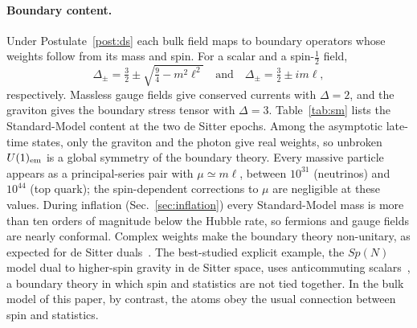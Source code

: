 \documentclass[reprint,aps,prd,amsmath,amssymb,superscriptaddress,nofootinbib,floatfix]{revtex4-2}
\theoremstyle{plain}
\theoremstyle{definition}
\theoremstyle{remark}
\begin{document}
\paragraph*{Boundary content.} Under Postulate~\ref{post:ds} each bulk field maps to boundary operators whose weights
follow from its mass and spin. For a scalar and a spin-$\tfrac12$ field,
\begin{equation}
\Delta_\pm=\tfrac32\pm\sqrt{\tfrac94-m^2\ell^2}\quad\text{and}\quad\Delta_\pm=\tfrac32\pm im\ell ,
\label{eq:weights}
\end{equation}
respectively. Massless gauge fields give conserved currents with $\Delta=2$, and the graviton gives the boundary stress
tensor with $\Delta=3$. Table~\ref{tab:sm} lists the Standard-Model content at the two de Sitter epochs. Among the asymptotic
late-time states, only the graviton and the photon give real weights, so unbroken $U(1)_{\rm em}$ is a global symmetry
of the boundary theory. Every massive particle appears as a principal-series pair with
$\mu\simeq m\ell$, between $10^{31}$ (neutrinos) and $10^{44}$ (top quark); the spin-dependent corrections to $\mu$ are
negligible at these values. During inflation (Sec.~\ref{sec:inflation}) every Standard-Model mass is more than ten orders of
magnitude below the Hubble rate, so fermions and gauge fields are nearly conformal. Complex weights make the
boundary theory non-unitary, as expected for de Sitter duals~\cite{Strominger2001,AHS2017}. The best-studied explicit
example, the $Sp(N)$ model dual to higher-spin gravity in de Sitter space, uses anticommuting scalars~\cite{AHS2017}, a
boundary theory in which spin and statistics are not tied together. In the bulk model of this paper, by contrast, the
atoms obey the usual connection between spin and statistics.
\end{document}
